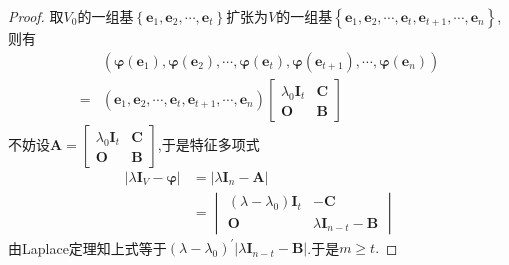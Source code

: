 {\begin{proof}
        取$V_0$的一组基$\left\{
            \bm{e}_1    ,\bm{e}_2,\cdots,\bm{e}_t
            \right\}$扩张为$V$的一组基$\left\{
            \bm{e}_1,\bm{e}_2,\cdots,\bm{e}_t,\bm{e}_{t+1},\cdots,\bm{e}_n
            \right\}$,则有
        \begin{align*}
              & \left(
            \bm{\varphi}\left(
                \bm{e}_1
                \right),
            \bm{\varphi}\left(
                \bm{e}_2
                \right),
            \cdots,
            \bm{\varphi}\left(
                \bm{e}_t
                \right),
            \bm{\varphi}\left(
                \bm{e}_{t+1}
                \right),
            \cdots,
            \bm{\varphi}\left(
                \bm{e}_n
                \right)
            \right)    \\
            = & \left(
            \bm{e}_1,\bm{e}_2,\cdots,\bm{e}_t,\bm{e}_{t+1},\cdots,\bm{e}_n
            \right)\begin{bmatrix}
                       \lambda_0\bm{I}_t & \bm{C} \\
                       \bm{O}            & \bm{B}
                   \end{bmatrix}
        \end{align*}
        不妨设$\bm{A}=\begin{bmatrix}
                \lambda_0\bm{I}_t & \bm{C} \\
                \bm{O}            & \bm{B}
            \end{bmatrix}$,于是特征多项式
        \begin{align*}
            \left|\lambda\bm{I}_V-\bm{\varphi}\right| & =
            \left|
            \lambda \bm{I}_n-\bm{A}
            \right|                                       \\
                                                      & =
            \begin{vmatrix}
                \left(
                \lambda-\lambda_0
                \right)\bm{I}_t & -\bm{C}                    \\
                \bm{O}          & \lambda\bm{I}_{n-t}-\bm{B}
            \end{vmatrix}
        \end{align*}
        由Laplace定理知上式等于$\left(
            \lambda-\lambda_0
            \right)^{\prime}\left|
            \lambda\bm{I}_{n-t}-\bm{B}
            \right|$.于是$m\geqslant t.$
    \end{proof}
}
